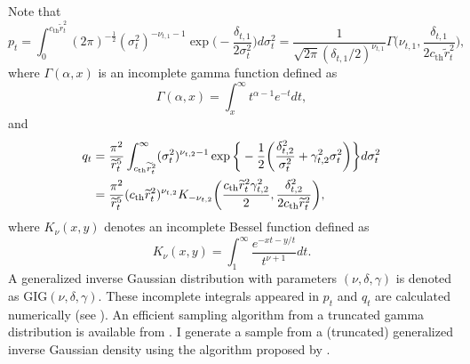 \documentclass[11pt]{article}
\begin{document}
Note that 
\begin{equation}
p_t =\int_{0}^{c_{\mathrm{th}}\widetilde{r}_t^2} (2\pi)^{-\frac{1}{2}} (\sigma^2_t)^{-\nu_{t,1}-1} \exp\bigg(-\frac{\delta_{t,1}}{2\sigma^2_t} \bigg) d\sigma^2_t  
=\frac{1}{\sqrt{2\pi} (\delta_{t,1}/2)^{\nu_{t,1}}} \Gamma \bigg( \nu_{t,1}, \frac{\delta_{t,1}}{2c_{\mathrm{th}} \widetilde{r}_t^2}\bigg),
\end{equation}
where $\Gamma(\alpha, x)$ is an incomplete gamma function defined as 
\begin{equation}
\Gamma(\alpha, x) =\int_{x}^{\infty} t^{\alpha-1} e^{-t} dt,
\end{equation}
and 
\begin{align}
q_t &=\frac{\pi^2}{\widetilde{r}_t^5} \int_{c_{\mathrm{th}}\widetilde{r}_t^2}^{\infty}  (\sigma^2_t)^{\nu_{t,2}-1} \exp\bigg\{ -\frac{1}{2}\bigg(\frac{\delta_{t,2}^2}{\sigma^2_t} +\gamma_{t, 2}^2\sigma^2_t \bigg)\bigg\}d\sigma^2_t \notag \\
&=\frac{\pi^2}{\widetilde{r}_t^5} (c_{\mathrm{th}} \widetilde{r}_t^2)^{\nu_{t,2}} K_{-\nu_{t,2}} \bigg(\frac{c_{\mathrm{th}} \widetilde{r}_t^2 \gamma_{t,2}^2}{2}, \frac{\delta_{t,2}^2}{2c_{\mathrm{th}} \widetilde{r}_t^2} \bigg),
\end{align}
where $K_\nu(x,y)$ denotes an incomplete Bessel function defined as 
\begin{equation}
K_\nu(x,y) =\int_{1}^\infty \frac{e^{-xt -y/t}}{t^{\nu+1}} dt.
\end{equation}
A generalized inverse Gaussian distribution with parameters $(\nu, \delta, \gamma)$ is denoted as $\mathrm{GIG}(\nu, \delta, \gamma)$. 
These incomplete integrals appeared in $p_t$ and $q_t$ are calculated numerically (see \cite{Harris(2008)}).
An efficient sampling algorithm from a truncated gamma distribution is available from \cite{Philippe(1997)}. 
I generate a sample from a (truncated) generalized inverse Gaussian density using the algorithm proposed by \cite{Dagpunar(1989)}. 
\end{document}
